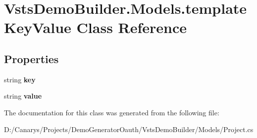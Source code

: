 \hypertarget{class_vsts_demo_builder_1_1_models_1_1template_key_value}{}\section{Vsts\+Demo\+Builder.\+Models.\+template\+Key\+Value Class Reference}
\label{class_vsts_demo_builder_1_1_models_1_1template_key_value}
\subsection*{Properties}
\begin{DoxyCompactItemize}
\item 
\mbox{\label{class_vsts_demo_builder_1_1_models_1_1template_key_value_abc6cf206fc1b5228c7cddc53f3dc88b6}} 
string {\bfseries key}
\item 
\mbox{\label{class_vsts_demo_builder_1_1_models_1_1template_key_value_a430c19afb3353a009dada59dfc7ee8d9}} 
string {\bfseries value}
\end{DoxyCompactItemize}


The documentation for this class was generated from the following file\+:\begin{DoxyCompactItemize}
\item 
D\+:/\+Canarys/\+Projects/\+Demo\+Generator\+Oauth/\+Vsts\+Demo\+Builder/\+Models/Project.\+cs\end{DoxyCompactItemize}
